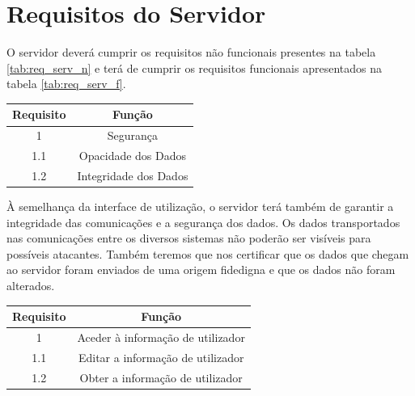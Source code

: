 \section{Requisitos do Servidor} \label{sec:req_servidor}
 
O servidor deverá cumprir os requisitos não funcionais presentes na tabela \ref{tab:req_serv_n} e terá de cumprir os requisitos funcionais apresentados na tabela \ref{tab:req_serv_f}.

\begin{center}
\begin{tabular}[c]{c c} 
\hline
Requisito & Função\\ %
\hline
1 & Segurança\\ 

1.1 & Opacidade dos Dados\\

1.2 & Integridade dos Dados\\
\hline
\end{tabular}
\label{tab:req_serv_n}
\end{center}
\vspace{8mm} %

À semelhança da interface de utilização, o servidor terá também de garantir a integridade das comunicações e a segurança dos dados. Os dados transportados nas comunicações entre os diversos sistemas não poderão ser visíveis para possíveis atacantes. Também teremos que nos certificar que os dados que chegam ao servidor foram enviados de uma origem fidedigna e que os dados não foram alterados.\\

\begin{center}
\begin{tabular}[c]{c c} 
\hline
Requisito & Função\\ %
\hline
1 & Aceder à informação de utilizador\\ 

1.1 & Editar a informação de utilizador\\

1.2 & Obter a informação de utilizador\\
\hline
\end{tabular}
\label{tab:req_serv_f}
\end{center}
\vspace{8mm} %

